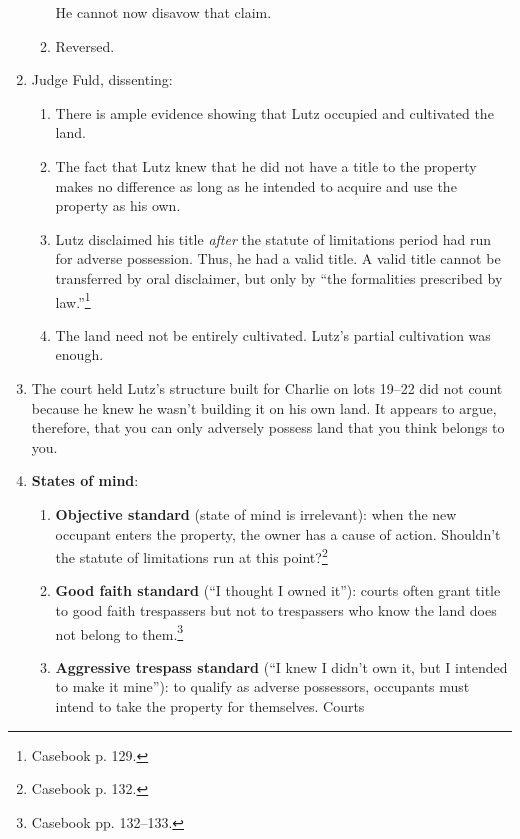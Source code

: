 \begin{enumerate}
\begin{enumerate}
        He cannot now disavow that claim.
        \item Reversed.
    \end{enumerate}
    \item Judge Fuld, dissenting:
    \begin{enumerate}
        \item There is ample evidence showing that Lutz occupied and 
        cultivated the land.
        \item The fact that Lutz knew that he did not have a title to the 
        property makes no difference as long as he intended to acquire and use 
        the property as his own.
        \item Lutz disclaimed his title \emph{after} the statute of 
        limitations period had run for adverse possession. Thus, he had a 
        valid title. A valid title cannot be transferred by oral disclaimer, 
        but only by ``the formalities prescribed by law.''\footnote{Casebook 
        p. 129.}
        \item The land need not be entirely cultivated. Lutz's partial 
        cultivation was enough.
    \end{enumerate}
    \item The court held Lutz's structure built for Charlie on 
    lots 19--22 did not count because he knew he wasn't building it on his own 
    land. It appears to argue, therefore, that you can only adversely possess land 
    that you think belongs to you.
    \item \textbf{States of mind}:
    \begin{enumerate}
        \item \textbf{Objective standard} (state of mind is irrelevant): when 
        the new occupant enters the property, the owner has a cause of action. 
        Shouldn't the statute of limitations run at this 
        point?\footnote{Casebook p. 132.}
        \item \textbf{Good faith standard} (``I thought I owned it''): courts 
        often grant title to good faith trespassers but not to trespassers who 
        know the land does not belong to them.\footnote{Casebook pp. 132--133.}
        \item \textbf{Aggressive trespass standard} (``I knew I didn't own it, 
        but I intended to make it mine''): to qualify as adverse possessors, 
        occupants must intend to take the property for themselves. Courts 

\end{enumerate}
\end{enumerate}

